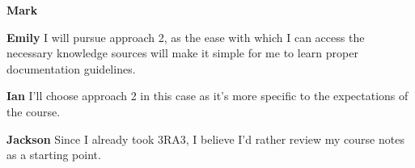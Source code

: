 \documentclass[12pt, titlepage]{article}
\begin{document}
\begin{enumerate}[leftmargin=*]
  \textbf{Mark}

  \textbf{Emily} I will pursue approach 2, as the ease with which I can access the necessary knowledge sources will make it simple for me to learn proper documentation guidelines.


  \textbf{Ian} I’ll choose approach 2 in this case as it’s more specific to the expectations of the course.

  \textbf{Jackson} Since I already took 3RA3, I believe I'd rather review my course notes as a starting point.

\end{enumerate}
\end{document}
